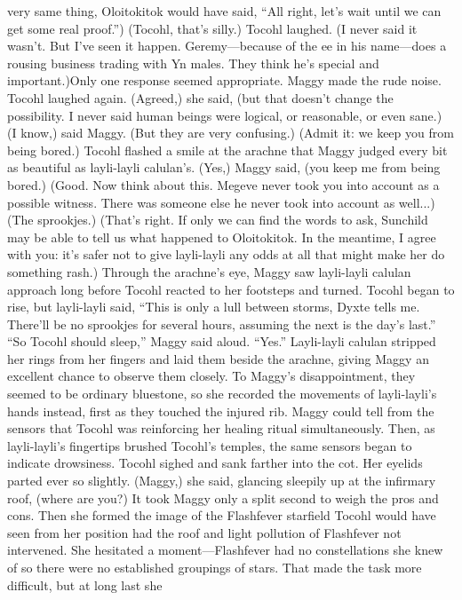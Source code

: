 \documentclass[9pt]{article}
\begin{document}
very same thing, Oloitokitok would have said, “All right, let’s wait until we can get some real proof.”)
(Tocohl, that’s silly.)
Tocohl laughed. (I never said it wasn’t. But I’ve seen it happen. Geremy—because of the ee in his
name—does a rousing business trading with Yn males. They think he’s special and important.)Only one response seemed appropriate. Maggy made the rude noise.
Tocohl laughed again. (Agreed,) she said, (but that doesn’t change the possibility. I never said human
beings were logical, or reasonable, or even sane.)
(I know,) said Maggy. (But they are very confusing.)
(Admit it: we keep you from being bored.) Tocohl flashed a smile at the arachne that Maggy judged
every bit as beautiful as layli-layli calulan’s.
(Yes,) Maggy said, (you keep me from being bored.)
(Good. Now think about this. Megeve never took you into account as a possible witness. There was
someone else he never took into account as well...)
(The sprookjes.)
(That’s right. If only we can find the words to ask, Sunchild may be able to tell us what happened to
Oloitokitok. In the meantime, I agree with you: it’s safer not to give layli-layli any odds at all that might
make her do something rash.)
Through the arachne’s eye, Maggy saw layli-layli calulan approach long before Tocohl reacted to
her footsteps and turned. Tocohl began to rise, but layli-layli said, “This is only a lull between storms,
Dyxte tells me. There’ll be no sprookjes for several hours, assuming the next is the day’s last.”
“So Tocohl should sleep,” Maggy said aloud.
“Yes.” Layli-layli calulan stripped her rings from her fingers and laid them beside the arachne, giving
Maggy an excellent chance to observe them closely. To Maggy’s disappointment, they seemed to be
ordinary bluestone, so she recorded the movements of layli-layli’s hands instead, first as they touched
the injured rib. Maggy could tell from the sensors that Tocohl was reinforcing her healing ritual
simultaneously. Then, as layli-layli’s fingertips brushed Tocohl’s temples, the same sensors began to
indicate drowsiness.
Tocohl sighed and sank farther into the cot. Her eyelids parted ever so slightly. (Maggy,) she said,
glancing sleepily up at the infirmary roof, (where are you?)
It took Maggy only a split second to weigh the pros and cons. Then she formed the image of the
Flashfever starfield Tocohl would have seen from her position had the roof and light pollution of
Flashfever not intervened. She hesitated a moment—Flashfever had no constellations she knew of so
there were no established groupings of stars. That made the task more difficult, but at long last she
\end{document}
